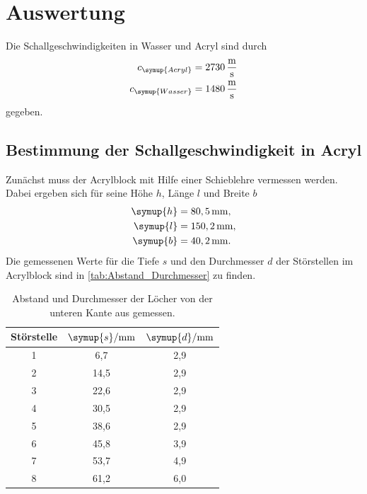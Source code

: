 \section{Auswertung}
\label{sec:Auswertung}

Die Schallgeschwindigkeiten in Wasser und Acryl sind durch
\begin{align*}
  c_{\symup{Acryl}} &= 2730\,\unit{\meter\per\second}\\
  c_{\symup{Wasser}}  &= 1480\,\unit{\meter\per\second}
\end{align*}
gegeben.


\subsection{Bestimmung der Schallgeschwindigkeit in Acryl}

Zunächst muss der Acrylblock mit Hilfe einer Schieblehre vermessen werden. Dabei ergeben sich für seine Höhe $h$, Länge $l$ und Breite $b$
\begin{align*}
  \symup{h} &= 80,5\,\unit{\milli\meter},\\
  \symup{l} &= 150,2\,\unit{\milli\meter},\\
  \symup{b} &= 40,2\,\unit{\milli\meter}.
\end{align*}
Die gemessenen Werte für die Tiefe $s$ und den Durchmesser $d$ der Störstellen im Acrylblock sind in \autoref{tab:Abstand_Durchmesser} zu finden.
\begin{table}[H]
  \centering
  \begin{tabular}{c c c}
    \toprule
    Störstelle & $\symup{s}/\unit{\milli\meter}$ & $\symup{d}/\unit{\milli\meter}$\\
    \midrule
    1 & 6,7 & 2,9 \\
    2 & 14,5 & 2,9 \\
    3 & 22,6 & 2,9 \\
    4 & 30,5 & 2,9 \\
    5 & 38,6 & 2,9 \\
    6 & 45,8 & 3,9 \\
    7 & 53,7 & 4,9 \\
    8 & 61,2 & 6,0 \\
    \bottomrule
  \end{tabular}
  \caption{Abstand und Durchmesser der Löcher von der unteren Kante aus gemessen.}
  \label{tab:Abstand_Durchmesser}
\end{table}

